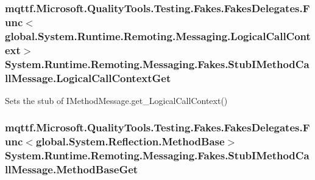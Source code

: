 \hypertarget{class_system_1_1_runtime_1_1_remoting_1_1_messaging_1_1_fakes_1_1_stub_i_method_call_message_af36a7963a5a7a21749307c7be047f067}{
\subsubsection[{Logical\-Call\-Context\-Get}]{\setlength{\rightskip}{0pt plus 5cm}mqttf.\-Microsoft.\-Quality\-Tools.\-Testing.\-Fakes.\-Fakes\-Delegates.\-Func$<$global.\-System.\-Runtime.\-Remoting.\-Messaging.\-Logical\-Call\-Context$>$ System.\-Runtime.\-Remoting.\-Messaging.\-Fakes.\-Stub\-I\-Method\-Call\-Message.\-Logical\-Call\-Context\-Get}}\label{class_system_1_1_runtime_1_1_remoting_1_1_messaging_1_1_fakes_1_1_stub_i_method_call_message_af36a7963a5a7a21749307c7be047f067}


Sets the stub of I\-Method\-Message.\-get\-\_\-\-Logical\-Call\-Context()

\hypertarget{class_system_1_1_runtime_1_1_remoting_1_1_messaging_1_1_fakes_1_1_stub_i_method_call_message_a650073f88db1eba8e16c4a6cee44f9fd}{
\subsubsection[{Method\-Base\-Get}]{\setlength{\rightskip}{0pt plus 5cm}mqttf.\-Microsoft.\-Quality\-Tools.\-Testing.\-Fakes.\-Fakes\-Delegates.\-Func$<$global.\-System.\-Reflection.\-Method\-Base$>$ System.\-Runtime.\-Remoting.\-Messaging.\-Fakes.\-Stub\-I\-Method\-Call\-Message.\-Method\-Base\-Get}}\label{class_system_1_1_runtime_1_1_remoting_1_1_messaging_1_1_fakes_1_1_stub_i_method_call_message_a650073f88db1eba8e16c4a6cee44f9fd}


